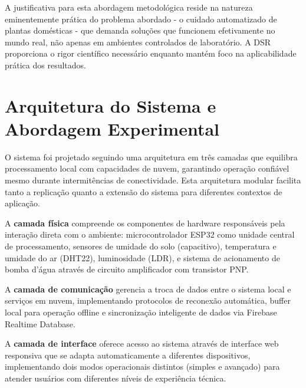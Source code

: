 A justificativa para esta abordagem metodológica reside na natureza eminentemente prática do problema abordado - o cuidado automatizado de plantas domésticas - que demanda soluções que funcionem efetivamente no mundo real, não apenas em ambientes controlados de laboratório. A DSR proporciona o rigor científico necessário enquanto mantém foco na aplicabilidade prática dos resultados.


\section{Arquitetura do Sistema e Abordagem Experimental}

O sistema foi projetado seguindo uma arquitetura em três camadas que equilibra processamento local com capacidades de nuvem, garantindo operação confiável mesmo durante intermitências de conectividade. Esta arquitetura modular facilita tanto a replicação quanto a extensão do sistema para diferentes contextos de aplicação.


A \textbf{camada física} compreende os componentes de hardware responsáveis pela interação direta com o ambiente: microcontrolador ESP32 como unidade central de processamento, sensores de umidade do solo (capacitivo), temperatura e umidade do ar (DHT22), luminosidade (LDR), e sistema de acionamento de bomba d'água através de circuito amplificador com transistor PNP.

A \textbf{camada de comunicação} gerencia a troca de dados entre o sistema local e serviços em nuvem, implementando protocolos de reconexão automática, buffer local para operação offline e sincronização inteligente de dados via Firebase Realtime Database.

A \textbf{camada de interface} oferece acesso ao sistema através de interface web responsiva que se adapta automaticamente a diferentes dispositivos, implementando dois modos operacionais distintos (simples e avançado) para atender usuários com diferentes níveis de experiência técnica.

